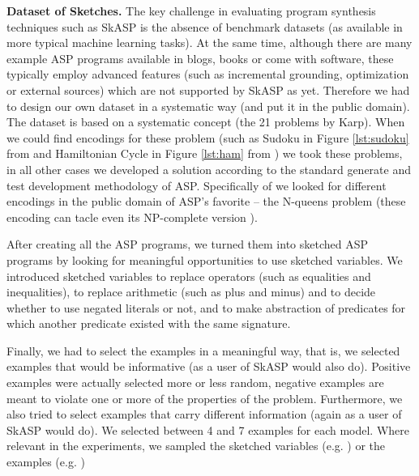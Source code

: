 \textbf{Dataset of Sketches.}
The key challenge in evaluating program synthesis techniques such as SkASP is the absence of 
benchmark datasets (as available in more typical machine learning tasks). At the same time,
although there are many example ASP programs available in blogs, books or come with software,
these typically employ advanced features (such as incremental grounding, optimization or external sources) which are not supported by SkASP as yet.
Therefore we had to design our own dataset in a systematic way (and put it in the public domain).
The dataset is based on a systematic concept (the 21 problems by Karp). When 
we could find encodings for these problem (such as Sudoku in Figure \ref{lst:sudoku} from \cite{asp_tutorial_sudoku} and Hamiltonian Cycle in Figure \ref{lst:ham} from \cite{ASPbook}) we took these problems, in all other cases we developed a solution according to the standard generate and test development methodology of ASP.
Specifically of \qfive we looked for different encodings in the public domain of ASP’s favorite -- the N-queens problem (these encoding can tacle even its NP-complete version \cite{complexity_nqueens}).

After creating all the ASP programs, we turned them into sketched ASP programs by looking for meaningful opportunities to use 
sketched variables. We introduced sketched variables to replace operators (such as equalities and inequalities), to replace arithmetic (such as plus and minus)
and to decide whether to use negated literals or not, and to make abstraction of predicates for which another predicate existed with the same signature.

Finally, we had to select the examples in a meaningful way, that is, we selected examples that would be informative
(as a user of SkASP would also do). Positive examples were actually selected more or less random,
negative examples are meant to violate one or more of the properties of the problem. Furthermore, we also 
tried to select examples that carry different information (again as a user of SkASP would do). We selected between 4 and 7 examples for each model. Where relevant in the experiments, we sampled the sketched variables (e.g. \qfive) or the examples (e.g. \qthree)



